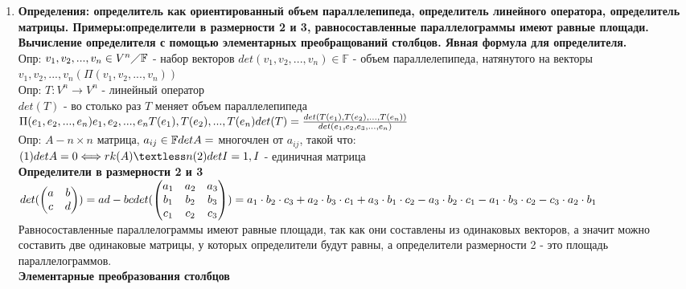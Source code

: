 \documentclass[12pt, oneside]{book}
\theoremstyle{definition}
\begin{document}
\begin{enumerate}
\item \textbf{Определения: определитель как ориентированный объем параллелепипеда, определитель линейного оператора, определитель матрицы. Примеры:определители в размерности 2 и 3, равносоставленные параллелограммы имеют равные площади. Вычисление определителя с помощью элементарных преобращований столбцов. Явная формула для определителя.}\\
Опр: $v_1, v_2, ..., v_n \in V^n \diagup \mathbb{F}$ - набор векторов
$det(v_1, v_2, ..., v_n) \in \mathbb{F}$ - объем параллелепипеда, натянутого на векторы $v_1, v_2, ..., v_n (\Pi (v_1, v_2, ..., v_n))$\\
Опр: $T: V^n \longrightarrow V^n$ - линейный оператор\\
$det(T)$ - во столько раз $T$ меняет объем параллелепипеда $\Pi (e_1, e_2, ..., e_n)\\
e_1, e_2, ..., e_n\\
T(e_1), T(e_2), ..., T(e_n)\\
det(T) = \frac{det(T(e_1), T(e_2), ..., T(e_n))}{det(e_1, e_2, e_3, ..., e_n)}$\\
Опр: $A - n \times n$ матрица, $a_{ij} \in \mathbb{F}\\
det A =$ многочлен от $a_{ij}$, такой что:\\
$(1)det A = 0 \Longleftrightarrow rk (A) \textless n\\
(2) det I = 1, I$ - единичная матрица\\
\textbf{Определители в размерности 2 и 3}
$det (\begin{pmatrix}
a & b \\
c & d
\end{pmatrix}) = ad - bc\\
det(\begin{pmatrix}
a_1 & a_2 & a_3\\
b_1 & b_2 & b_3\\
c_1 & c_2 & c_3\\
\end{pmatrix}) = a_1 \cdot b_2 \cdot c_3 + a_2 \cdot b_3 \cdot c_1 + a_3 \cdot b_1 \cdot c_2 - a_3 \cdot b_2 \cdot c_1 - a_1 \cdot b_3 \cdot c_2 - c_3 \cdot a_2 \cdot b_1$ \\
Равносоставленные параллелограммы имеют равные площади, так как они составлены из одинаковых векторов, а значит можно составить две одинаковые матрицы, у которых определители будут равны, а определители размерности 2 - это площадь параллелограммов.\\
\textbf{Элементарные преобразования столбцов}\\

\end{enumerate}
\end{document}
